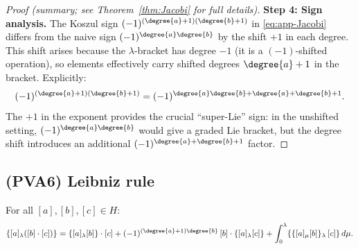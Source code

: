 \begin{proof}[Proof (summary; see Theorem~\ref{thm:Jacobi} for full details)]
\textbf{Step 4: Sign analysis.}
The Koszul sign $(-1)^{(\degree{a}+1)(\degree{b}+1)}$ in \eqref{eq:app-Jacobi} differs from the naive sign $(-1)^{\degree{a}\degree{b}}$ by the shift $+1$ in each degree. This shift arises because the $\lambda$-bracket has degree $-1$ (it is a $(-1)$-shifted operation), so elements effectively carry shifted degrees $\degree{a}+1$ in the bracket. Explicitly:
\[
(-1)^{(\degree{a}+1)(\degree{b}+1)} = (-1)^{\degree{a}\degree{b}+\degree{a}+\degree{b}+1}.
\]
The $+1$ in the exponent provides the crucial ``super-Lie'' sign: in the unshifted setting, $(-1)^{\degree{a}\degree{b}}$ would give a graded Lie bracket, but the degree shift introduces an additional $(-1)^{\degree{a}+\degree{b}+1}$ factor.
\end{proof}

\subsection{(PVA6) Leibniz rule}

\begin{proposition}
\label{prop:app-Leibniz}
For all $[a],[b],[c]\in H$:
\begin{equation}
\label{eq:app-Leibniz}
\{[a]{}_\lambda ([b]\cdot[c])\} = \{[a]{}_\lambda [b]\}\cdot [c] + (-1)^{(\degree{a}+1)\degree{b}}\,[b]\cdot\{[a]{}_\lambda [c]\} + \int_0^\lambda \{\{[a]{}_\mu [b]\}{}_\lambda\, [c]\}\,d\mu.
\end{equation}
\end{proposition}

